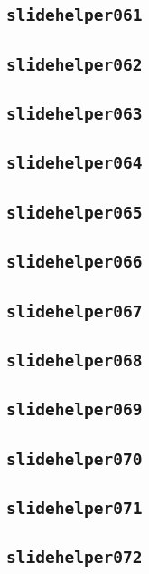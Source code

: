\subsection{\texttt{slidehelper061}}
\newpage
\subsection{\texttt{slidehelper062}}
\newpage
\subsection{\texttt{slidehelper063}}
\newpage
\subsection{\texttt{slidehelper064}}
\newpage
\subsection{\texttt{slidehelper065}}
\newpage
\subsection{\texttt{slidehelper066}}
\newpage
\subsection{\texttt{slidehelper067}}
\newpage
\subsection{\texttt{slidehelper068}}
\newpage
\subsection{\texttt{slidehelper069}}
\newpage
\subsection{\texttt{slidehelper070}}
\newpage
\subsection{\texttt{slidehelper071}}
\newpage
\subsection{\texttt{slidehelper072}}
\newpage

